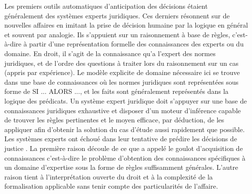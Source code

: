 Les premiers outils automatiques d'anticipation des décisions étaient généralement des systèmes experts juridiques. Ces derniers résonnent  sur de nouvelles affaires en imitant la prise de décision humaine par la logique en général et souvent par analogie. Ils s'appuient sur un raisonnement à base de règles, c'est-à-dire à partir d'une représentation formelle des connaissances des experts ou du domaine. En droit, il s'agit de la connaissance qu'a l'expert des normes juridiques, et de l'ordre des questions à traiter lors du raisonnement sur un cas (appris par expérience). Le modèle explicite de domaine nécessaire ici se trouve dans une base de connaissances où les normes juridiques sont représentées sous forme de \og SI ... ALORS ...\fg{}, et les faits sont généralement représentés dans la logique des prédicats. Un système expert juridique doit s’appuyer sur une base de connaissances juridiques exhaustive et disposer d’un moteur d’inférence capable de trouver les règles pertinentes et le moyen efficace, par déduction, de les appliquer afin d’obtenir la solution du cas d'étude aussi rapidement que possible. Les systèmes experts ont échoué dans leur tentative de prédire les décisions de justice \citep{leith2010risefall}. La première raison découle de ce que \citet{Berka2011rbr-cbr} a appelé le \og goulot d'acquisition de connaissances \fg{} c'est-à-dire le problème d'obtention des connaissances spécifiques à un domaine d’expertise sous la forme de règles suffisamment générales. L'autre raison tient à l'interprétation ouverte du droit et à la complexité de la formalisation applicable sans tenir compte des particularités de l'affaire.

